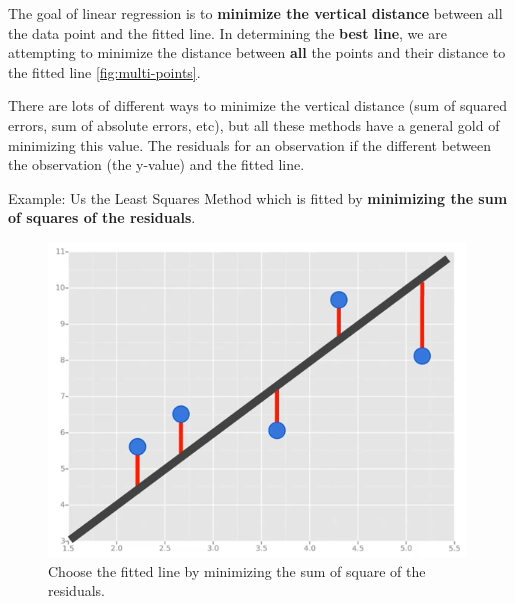 \documentclass{article}
\begin{document}
\par The goal of linear regression is to {\bf{minimize the vertical distance}} between all the data point and the fitted line. In determining the {\bf{best line}}, we are attempting to minimize the distance between {\bf{all}} the points and their distance to the fitted line \ref{fig:multi-points}.

\par There are lots of different ways to minimize the vertical distance (sum of squared errors, sum of absolute errors, etc), but all these methods have a general gold of minimizing this value. The residuals for an observation if the different between the observation (the y-value)  and the fitted line.

\par Example: Us the Least Squares Method which is fitted by {\bf{minimizing the sum of squares of the residuals}}.
\begin{figure}[H]
\centering
\includegraphics[width=0.6\linewidth]{pic/residuals-example.png}
\caption{Choose the fitted line by minimizing the sum of square of the residuals.}
\end{figure}
\end{document}

